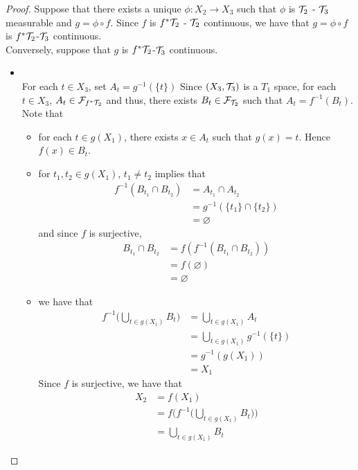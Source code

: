 \documentclass{book}
\begin{document}
	\begin{proof}
	Suppose that there exists a unique $\phi: X_2 \rightarrow X_3$ such that $\phi$ is $\mathcal{T}_2$ - $\mathcal{T}_3$ measurable and $g = \phi \circ f$. Since $f$ is $f^* \mathcal{T}_2$ - $\mathcal{T}_2$ continuous, we have that $g = \phi \circ f$ is $f^*\mathcal{T}_2$-$\mathcal{T}_3$ continuous.  \\
	Conversely, suppose that $g$ is $f^*\mathcal{T}_2$-$\mathcal{T}_3$ continuous. \\
	\begin{itemize}
	\item {} \\
	For each $t \in X_3$, set $A_t = g^{-1}(\{t\})$ Since $(X_3, \mathcal{T}_3)$ is a $T_1$ space, for each $t \in X_3$, $A_t \in \mathcal{F}_{f^*\mathcal{T}_2}$ and thus, there exists $B_t \in \mathcal{F}_{\mathcal{T}_2}$ such that $A_t = f^{-1}(B_t)$. \\
	Note that 
	\begin{itemize}
	\item for each $t \in g(X_1)$, there exists $x \in A_t$ such that $g(x) = t$. Hence $f(x) \in B_t$.\\
	\item for $t_1, t_2 \in g(X_1)$, $t_1 \neq t_2$ implies that
	\begin{align*}
	f^{-1}(B_{t_1} \cap B_{t_2}) 
	&= A_{t_1} \cap A_{t_2} \\
	&= g^{-1}(\{t_1\} \cap \{t_2\}) \\
	&= \varnothing
	\end{align*}	 
	and since $f$ is surjective, 
	\begin{align*}
	B_{t_1} \cap  B_{t_2} 
	& = f(f^{-1}(B_{t_1} \cap  B_{t_2} )) \\
	&= f(\varnothing) \\
	&= \varnothing
	\end{align*}
	\item we have that 
	\begin{align*}
	f^{-1} \bigg( \bigcup_{t \in g(X_1)} B_t\bigg) 
	&=  \bigcup_{t \in g(X_1)} A_t \\
	&= \bigcup_{t \in g(X_1)} g^{-1}(\{t\}) \\
	&= g^{-1}(g(X_1)) \\
	&= X_1
	\end{align*}
	Since $f$ is surjective, we have that 
	\begin{align*}
	X_2
	&= f(X_1) \\
	&= f \bigg( f^{-1} \bigg( \bigcup_{t \in g(X_1)} B_t\bigg)  \bigg) \\
	&= \bigcup_{t \in g(X_1)} B_t

\end{align*}
\end{itemize}
\end{itemize}
\end{proof}
\end{document}
